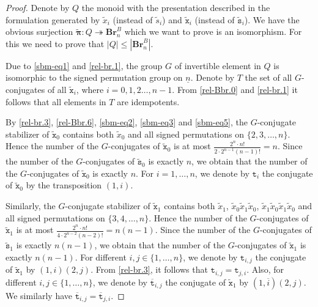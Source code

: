 \documentclass[a4paper]{amsart}
\newcommand{\tto}{\twoheadrightarrow}
\begin{document}
\begin{proof}
Denote by $Q$ the monoid with the presentation described in the 
formulation generated by $\tilde{x}_i$ (instead of $\tilde{s}_i$)
and $\tilde{\mathtt{x}}_i$ (instead of $\tilde{\mathtt{s}}_i$). 
We have the obvious surjection $\tilde{\boldsymbol{\pi}}:Q\tto \mathbf{Br}_n^B$
which we want to prove is an isomorphism. For this we need to prove
that $|Q|\leq |\mathbf{Br}_n^B|$.

Due to \eqref{sbm-eq1} and \eqref{rel-br.1}, the group $G$ of invertible
element in $Q$ is isomorphic to the signed permutation group on $\underline{n}$.
Denote by $T$ the set of all $G$-conjugates of all $\tilde{\mathtt{x}}_i$,
where $i=0,1,2\dots,n-1$. From \eqref{rel-Bbr.0} and \eqref{rel-br.1}
it follows that all elements in $T$ are idempotents.

By \eqref{rel-br.3}, \eqref{rel-Bbr.6}, \eqref{sbm-eq2}, \eqref{sbm-eq3} and \eqref{sbm-eq5},
the $G$-conjugate stabilizer of $\tilde{\mathtt{x}}_0$ contains both 
$\tilde{x}_0$ and all signed permutations on $\{2,3,\dots,n\}$. Hence the number of
the $G$-conjugates of $\tilde{\mathtt{x}}_0$ is at most
$\frac{2^n\cdot n!}{2\cdot 2^{n-1}(n-1)!}=n$. Since the number of 
the $G$-conjugates of $\tilde{\mathtt{s}}_0$ is exactly $n$,
we obtain that the number of
the $G$-conjugates of $\tilde{\mathtt{x}}_0$ is exactly $n$.
For $i=1,\dots,n$, we denote by $\mathtt{t}_i$ the conjugate of 
$\tilde{\mathtt{x}}_0$ by the transposition $(1,i)$.

Similarly, the $G$-conjugate stabilizer of $\tilde{\mathtt{x}}_1$ contains both 
$\tilde{x}_1$, $\tilde{x}_0\tilde{x}_1\tilde{x}_0$,
$\tilde{x}_1\tilde{x}_0\tilde{x}_1\tilde{x}_0$ and 
all signed permutations on $\{3,4,\dots,n\}$. Hence the number of
the $G$-conjugates of $\tilde{\mathtt{x}}_1$ is at most
$\frac{2^n\cdot n!}{4\cdot 2^{n-2}(n-2)!}=n(n-1)$. Since the number of 
the $G$-conjugates of $\tilde{\mathtt{s}}_1$ is exactly $n(n-1)$,
we obtain that the number of
the $G$-conjugates of $\tilde{\mathtt{x}}_1$ is exactly $n(n-1)$.
For different $i,j\in\{1,\dots,n\}$, we denote by $\mathtt{t}_{i,j}$ 
the conjugate of $\tilde{\mathtt{x}}_1$ by $(1,i)(2,j)$.
From \eqref{rel-br.3}, it follows that $\mathtt{t}_{i,j}=\mathtt{t}_{j,i}$.
Also, for different $i,j\in\{1,\dots,n\}$, we denote by 
$\overline{\mathtt{t}}_{i,j}$  the conjugate of $\tilde{\mathtt{x}}_1$ by 
$(1,\overline{i})(2,j)$. We similarly have 
$\overline{\mathtt{t}}_{i,j}=\overline{\mathtt{t}}_{j,i}$.


\end{proof}
\end{document}
